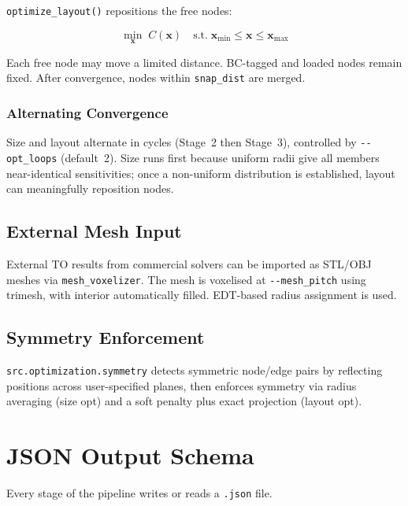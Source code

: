 \documentclass[a4paper, 11pt, openany]{report}
\begin{document}
\texttt{optimize\_layout()} repositions the free nodes:

\begin{equation}
\label{eq:layout}
\min_{\mathbf{x}} \; C(\mathbf{x}) \quad \text{s.t.} \;
\mathbf{x}_{\min} \le \mathbf{x} \le \mathbf{x}_{\max}
\end{equation}

Each free node may move a limited distance.  BC-tagged and loaded nodes remain
fixed.  After convergence, nodes within \texttt{snap\_dist} are merged.


\subsubsection{Alternating Convergence}

Size and layout alternate in cycles (Stage~2 then Stage~3), controlled by
\texttt{-{}-opt\_loops} (default~2).  Size runs first because uniform radii give
all members near-identical sensitivities; once a non-uniform distribution is
established, layout can meaningfully reposition nodes.


\subsection{External Mesh Input}
\label{sec:alg-mesh}

External TO results from commercial solvers can be imported as STL/OBJ meshes
via \texttt{mesh\_voxelizer}.  The mesh is voxelised at \texttt{-{}-mesh\_pitch}
using trimesh, with interior automatically filled.  EDT-based radius assignment
is used.


\subsection{Symmetry Enforcement}
\label{sec:alg-symmetry}

\texttt{src.optimization.symmetry} detects symmetric node/edge pairs by
reflecting positions across user-specified planes, then enforces symmetry via
radius averaging (size opt) and a soft penalty plus exact projection (layout
opt).


\section{JSON Output Schema}
\label{sec:json-schema}

Every stage of the pipeline writes or reads a \texttt{.json} file.
\end{document}
